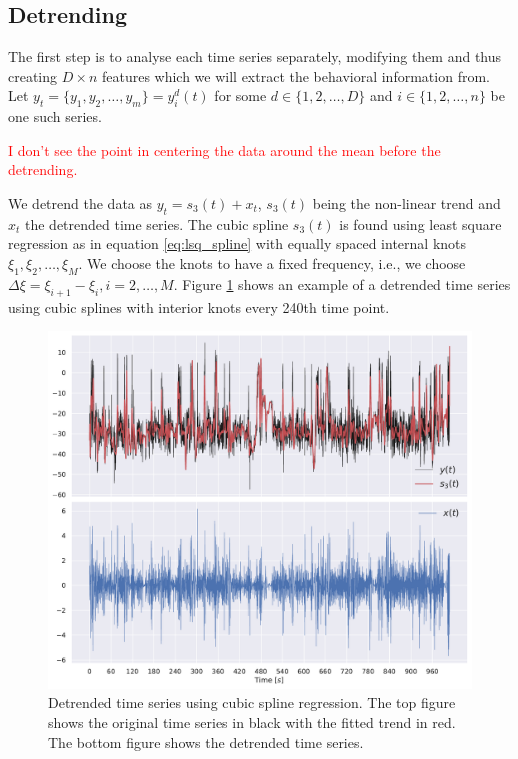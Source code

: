 \documentclass[a4paper]{memoir}
\theoremstyle{plain}
\theoremstyle{definition}
\theoremstyle{remark}
\begin{document}
\subsection{Detrending}
The first step is to analyse each time series separately, modifying them and thus creating $D \times n$ features which we will extract the behavioral information from.
Let $y_t = \{ y_1, y_2, \hdots, y_m \} = y_i^d(t)$ for some $d \in \{ 1, 2, \hdots, D \}$ and $i \in \{ 1, 2, \hdots, n \}$ be one such series.

\textcolor{red}{I don't see the point in centering the data around the mean before the detrending.}

We detrend the data as $y_t = s_3(t) + x_t$, $s_3(t)$ being the non-linear trend and $x_t$ the detrended time series.
The cubic spline $s_3(t)$ is found using least square regression as in equation \eqref{eq:lsq_spline} with equally spaced internal knots $\xi_1, \xi_2, \hdots, \xi_M$.
We choose the knots to have a fixed frequency, i.e., we choose $\Delta \xi= \xi_{i+1} - \xi_i, i = 2, \hdots, M$.
Figure \ref{fig:detrending_bc} shows an example of a detrended time series using cubic splines with interior knots every 240th time point.


\begin{figure}[tb ]
        \centering
        \includegraphics[width=\linewidth]{./code/figures/detrending/detrending_animal_1_BackPitch.pdf}
        \caption{Detrended time series using cubic spline regression.
        The top figure shows the original time series in black with the fitted trend in red.
The bottom figure shows the detrended time series.}
        \label{fig:detrending_bc}
\end{figure}
\end{document}
